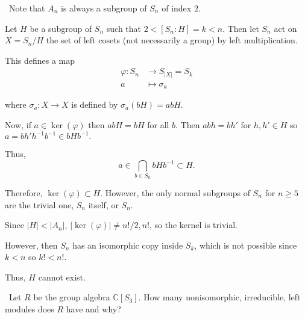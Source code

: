 \documentclass[12pt]{Qual}
\begin{document}
\begin{solution}$\,$
Note that $A_n$ is always a subgroup of $S_n$ of index $2.$

Let $H$ be a subgroup of $S_n$ such that $2<[S_n:H]=k<n$. Then let $S_n$ act on $X=S_n/H$ the set of left cosets (not necessarily a group) by left multiplication.

This defines a map \begin{align*}
    \varphi:S_n&\to S_{|X|}=S_k\\
    a&\mapsto \sigma_a
\end{align*}

where $\sigma_a:X\to X$ is defined by $\sigma_a(bH)=abH$.

Now, if $a\in\ker(\varphi)$ then $abH=bH$ for all $b$. Then $abh=bh'$ for $h,h'\in H$ so $a=bh'h^{-1}b^{-1}\in bHb^{-1}.$

Thus, $$a\in \bigcap_{b\in S_n}bHb^{-1}\subset H.$$

Therefore, $\ker(\varphi)\subset H$. However, the only normal subgroups of $S_n$ for $n\ge 5$ are the trivial one, $S_n$ itself, or $S_n.$

Since $|H|<|A_n|$, $|\ker(\varphi)|\not=n!/2,n!$, so the kernel is trivial.

However, then $S_n$ has an isomorphic copy inside $S_k$, which is not possible since $k<n$ so $k!<n!.$

Thus, $H$ cannot exist.
\end{solution}
\newpage




\begin{problem} $\,$
Let $R$ be the group algebra $\mathbb{C}[S_3]$. How many nonisomorphic, irreducible, left modules does $R$ have and why?
\end{problem}
\end{document}
